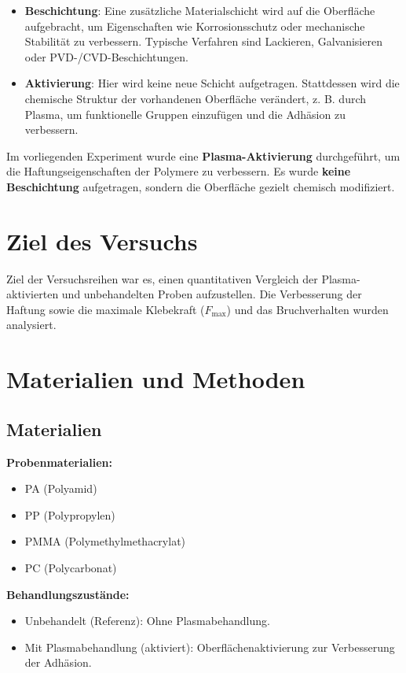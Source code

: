\documentclass[a4paper,12pt]{article}
\begin{document}
\begin{itemize}
    \item \textbf{Beschichtung}: Eine zusätzliche Materialschicht wird auf die Oberfläche aufgebracht, um Eigenschaften wie 
    Korrosionsschutz oder mechanische Stabilität zu verbessern. Typische Verfahren sind Lackieren, Galvanisieren oder PVD-/CVD-Beschichtungen.
    \item \textbf{Aktivierung}: Hier wird keine neue Schicht aufgetragen. Stattdessen wird die chemische Struktur der vorhandenen Oberfläche 
    verändert, z. B. durch Plasma, um funktionelle Gruppen einzufügen und die Adhäsion zu verbessern.
\end{itemize}

Im vorliegenden Experiment wurde eine \textbf{Plasma-Aktivierung} durchgeführt, um die Haftungseigenschaften der Polymere zu verbessern. Es wurde \textbf{keine Beschichtung} aufgetragen, sondern die Oberfläche gezielt chemisch modifiziert.

\section{Ziel des Versuchs}
Ziel der Versuchsreihen war es, einen quantitativen Vergleich der 
Plasma-aktivierten und unbehandelten Proben aufzustellen. Die Verbesserung 
der Haftung sowie die maximale Klebekraft ($F_{\text{max}}$) und das 
Bruchverhalten wurden analysiert.


\section{Materialien und Methoden}
\subsection{Materialien}
\textbf{Probenmaterialien:}
\begin{itemize}
    \item PA (Polyamid)
    \item PP (Polypropylen)
    \item PMMA (Polymethylmethacrylat)
    \item PC (Polycarbonat)
\end{itemize}
\textbf{Behandlungszustände:}
\begin{itemize}
    \item Unbehandelt (Referenz): Ohne Plasmabehandlung.
    \item Mit Plasmabehandlung (aktiviert): Oberflächenaktivierung zur 
          Verbesserung der Adhäsion.
\end{itemize}
\end{document}
